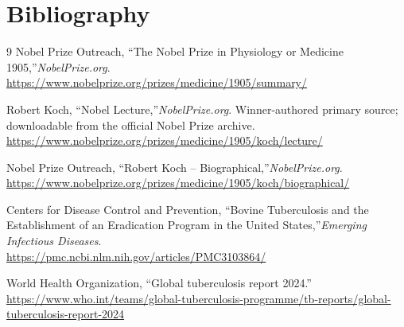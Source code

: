 \section{Bibliography}

\begin{thebibliography}{9}
Nobel Prize Outreach, ``The Nobel Prize in Physiology or Medicine 1905,''\emph{NobelPrize.org}.\\
\url{https://www.nobelprize.org/prizes/medicine/1905/summary/}

Robert Koch, ``Nobel Lecture,''\emph{NobelPrize.org}. Winner-authored primary source; downloadable from the official Nobel Prize archive.\\
\url{https://www.nobelprize.org/prizes/medicine/1905/koch/lecture/}

Nobel Prize Outreach, ``Robert Koch -- Biographical,''\emph{NobelPrize.org}.\\
\url{https://www.nobelprize.org/prizes/medicine/1905/koch/biographical/}

Centers for Disease Control and Prevention, ``Bovine Tuberculosis and the Establishment of an Eradication Program in the United States,''\emph{Emerging Infectious Diseases}.\\
\url{https://pmc.ncbi.nlm.nih.gov/articles/PMC3103864/}

World Health Organization, ``Global tuberculosis report 2024.''\\
\url{https://www.who.int/teams/global-tuberculosis-programme/tb-reports/global-tuberculosis-report-2024}
\end{thebibliography}
